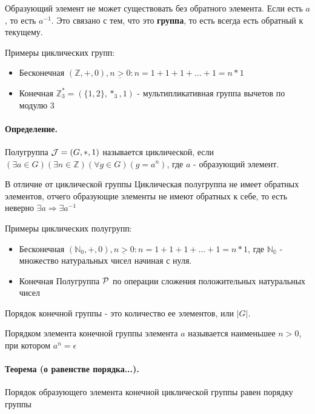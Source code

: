 \documentclass{report}
\begin{document}
\medskip

Образующий элемент не может существовать без обратного элемента. Если есть $a$, то есть $a^{-1}$.
Это связано с тем, что это {\bf группа}, то есть всегда есть обратный к текущему.

\medskip

Примеры циклических групп:
\begin{itemize}
	\item Бесконечная\newline
	      $(\mathbb{Z}, +, 0), \underline{n > 0}: n = 1 + 1 + 1 + \ldots + 1 = n * 1$
	\item Конечная\newline
	      $\mathbb{Z}^{*}_3 = (\{1,2\}, *_{3}, 1)$ - мультипликативная группа вычетов по модулю 3
\end{itemize}

\paragraph*{Определение.} Полугруппа ${\cal J} = (G, *, 1)$ называется циклической,
если $(\exists a \in G)(\exists n \in \mathbb{Z})(\forall g \in G)(g = a^{n})$, где $a$ - образующий элемент.

В отличие от циклической группы Циклическая полугруппа не имеет обратных элементов, отчего
образующие элементы не имеют обратных к себе, то есть неверно $\exists a \Rightarrow \exists a^{-1}$

\medskip

Примеры циклических полугрупп:
\begin{itemize}
	\item Бесконечная\newline
	      $(\mathbb{N}_0, +, 0), \underline{n > 0}: n = 1 + 1 + 1 + \ldots + 1 = n * 1$,
	      где $\mathbb{N_{0}}$ - множество натуральных чисел начиная с нуля.
	\item Конечная\newline
	      Полугруппа $\cal P$ по операции сложения положительных натуральных чисел
\end{itemize}

\medskip

Порядок конечной группы - это количество ее элементов, или $|G|$.

\medskip

Порядком элемента конечной группы элемента $a$ называется наименьшее $n > 0$, при котором
$a^{n} = \epsilon$

\paragraph*{Теорема (о равенстве порядка...).}
Порядок образующего элемента конечной циклической группы равен порядку группы
\end{document}
